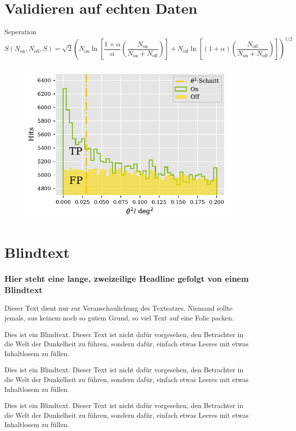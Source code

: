 \documentclass[aspectratio=1610, professionalfonts, 9pt]{beamer}
\begin{document}
\section{Validieren auf echten Daten}
\begin{frame}
  \begin{block}{Seperation}
	\begin{equation*}
	S\left( N_\text{on}, N_\text{off}, S \right) = \sqrt{2} \left( N_\text{on} \ln \left[ \frac{1+ \alpha}{\alpha}\left( \frac{N_\text{on}}{N_\text{on} + N_\text{off}} \right) \right] + N_\text{off} \ln \left[ \left( 1+ \alpha \right) \left( \frac{N_\text{off}}{N_\text{on} + N_\text{off}} \right) \right] \right)^{1/2}
	\end{equation*}
  \end{block}
  \begin{figure}
	\centering
	\includegraphics[height=0.7\textheight]{./Plots/on_off_ratio.pdf}
  \end{figure}
\end{frame}

\section{Blindtext}
\begin{frame}
  \frametitle{Hier steht eine lange, zweizeilige Headline
  \newline gefolgt von einem Blindtext}
  Dieser Text dient nur zur Veranschaulichung des Textsatzes. Niemand sollte jemals, aus keinem noch so gutem Grund, so viel Text auf eine Folie packen.

  Dies ist ein Blindtext. Dieser Text ist nicht dafür vorgesehen, den Betrachter in die Welt der Dunkelheit zu führen, sondern dafür, einfach etwas Leeres mit etwas Inhaltlosem zu füllen.

  Dies ist ein Blindtext. Dieser Text ist nicht dafür vorgesehen, den Betrachter in die Welt der Dunkelheit zu führen, sondern dafür, einfach etwas Leeres mit etwas Inhaltlosem zu füllen.

  Dies ist ein Blindtext. Dieser Text ist nicht dafür vorgesehen, den Betrachter in die Welt der Dunkelheit zu führen, sondern dafür, einfach etwas Leeres mit etwas Inhaltlosem zu füllen.
\end{frame}
\end{document}
